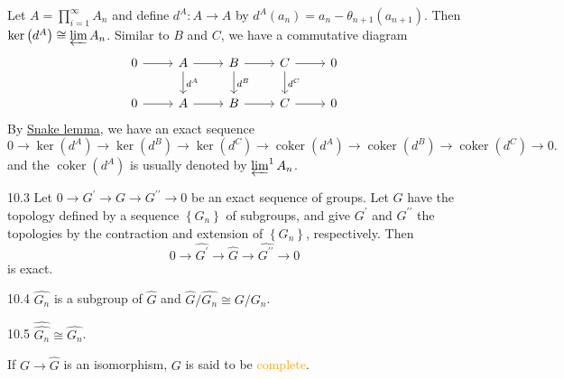 \begin{definition}\label{deflim1}
	Let $A=\prod_{i=1}^\infty A_n$ and define $d^A:A\rightarrow A$ by $d^A\left(a_n\right)=a_n-\theta_{n+1}\left(a_{n+1}\right)$. Then $\ker\left(d^A\right)\cong\varprojlim A_n$. Similar to $B$ and $C$, we have a commutative diagram
\begin{equation*}
	\begin{tikzcd}
		0\arrow[r]&A\arrow[r]\arrow[d,"d^A"]&B\arrow[r]\arrow[d,"d^B"]&C\arrow[r]\arrow[d,"d^C"]&0\\
		0\arrow[r]&A\arrow[r]&B\arrow[r]&C\arrow[r]&0
	\end{tikzcd}
\end{equation*}
By \hyperref[2.10]{Snake lemma}, we have an exact sequence
\begin{equation*}
	0\longrightarrow\ker\left(d^A\right)\longrightarrow\ker\left(d^B\right)\longrightarrow\ker\left(d^C\right)\longrightarrow
	\operatorname{coker}\left(d^A\right)\longrightarrow\operatorname{coker}\left(d^B\right)\longrightarrow\operatorname{coker}\left(d^C\right)\longrightarrow0.
\end{equation*}
and the $\operatorname{coker}\left(d^A\right)$ is usually denoted by \textcolor{orange}{$\varprojlim^1A_n$}.
\end{definition}

\begin{corollary}{10.3}
	Let $0\rightarrow G^\prime\rightarrow G\rightarrow G^{\prime\prime}\rightarrow0$ be an exact sequence of groups. Let $G$ have the topology defined by a sequence $\left\{G_n\right\}$ of subgroups, and give $G^\prime$ and $G^{\prime\prime}$ the topologies by the contraction and extension of $\left\{G_n\right\}$, respectively. Then
	\begin{equation*}
		0\rightarrow\hat{G^\prime}\rightarrow\hat{G}\rightarrow\hat{G^{\prime\prime}}\rightarrow0
	\end{equation*}
	is exact.
\end{corollary}

\begin{corollary}{10.4}
	$\hat{G_n}$ is a subgroup of $\hat{G}$ and $\hat{G}/\hat{G_n}\cong G/G_n$.
\end{corollary}

\begin{corollary}{10.5}
	$\hat{\hat{G_n}}\cong\hat{G_n}$.
\end{corollary}

If $G\rightarrow\hat{G}$ is an isomorphism, $G$ is said to be \textcolor{orange}{complete}.


